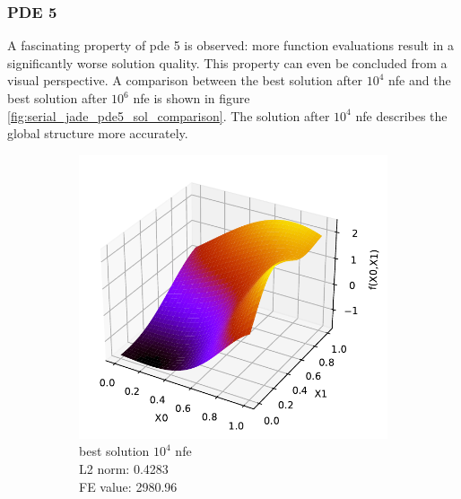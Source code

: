 \documentclass[./\jobname.tex]{subfiles}
\begin{document}
\subsubsection{PDE 5}
\label{chap:ex0_pde5}
A fascinating property of \gls{pde} 5 is observed: more function evaluations result in a significantly worse solution quality. This property can even be concluded from a visual perspective. A comparison between the best solution after $10^4$ \gls{nfe} and the best solution after $10^6$ \gls{nfe} is shown in figure \ref{fig:serial_jade_pde5_sol_comparison}. The solution after $10^4$ \gls{nfe} describes the global structure more accurately. 
\begin{figure}[h]
	\centering
	\begin{subfigure}[b]{0.3333\linewidth}
		\centering
		\includegraphics[width=1\textwidth]{../../code/experiments/experiment_0/pde5_best_sol_10_4.pdf}
		\caption{best solution $10^4$ \gls{nfe} \\ L2 norm: 0.4283 \\ FE value: 2980.96}
		\label{fig:pde5_sol_10_4}
	\end{subfigure}%
	\begin{subfigure}[b]{0.3333\linewidth}
		\centering

\end{subfigure}
\end{figure}
\end{document}
